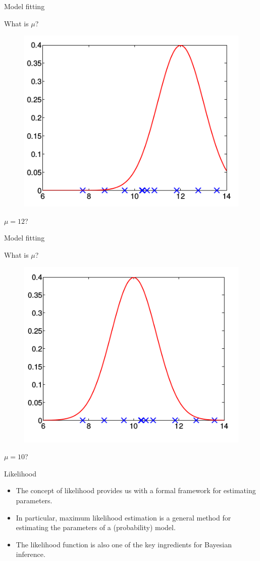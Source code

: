 \documentclass{beamer}
\begin{document}
\begin{frame}{Model fitting}

	\begin{center}
                What is $\mu$?
        \end{center}

        \begin{figure}
                \includegraphics[width=0.4\linewidth]{fit3.png}
        \end{figure}

        $\mu=12$?

\end{frame}

\begin{frame}{Model fitting}

	\begin{center}
                What is $\mu$?
        \end{center}

        \begin{figure}
                \includegraphics[width=0.4\linewidth]{fit4.png}
        \end{figure}

        $\mu=10$?

\end{frame}

\begin{frame}{Likelihood}

	\begin{itemize}
		\item The concept of likelihood provides us with a formal framework for
			estimating parameters.
		\item In particular, maximum likelihood estimation is a general method
			for estimating the parameters of a (probability) model.
		\item The likelihood function is also one of the key ingredients for
Bayesian inference.
	\end{itemize}

\end{frame}
\end{document}
